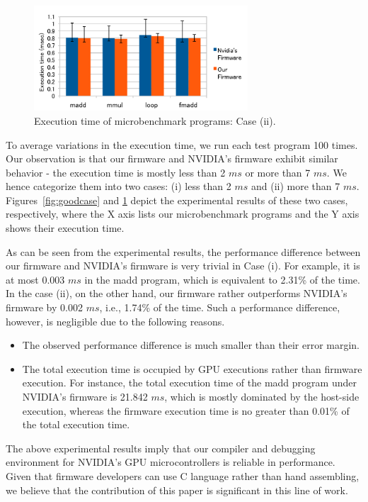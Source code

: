 \begin{figure}
 \begin{center}
  \includegraphics[width=8cm]{./img/bad_case.pdf}
 \end{center}
 \caption{Execution time of microbenchmark programs: Case (ii).}
 \label{fig:badcase}
\end{figure}

To average variations in the execution time, we run each test program 100
times.
Our observation is that our firmware and NVIDIA's firmware exhibit
similar behavior - the execution time is mostly less than 2 $ms$ or more
than 7 $ms$. 
We hence categorize them into two cases: (i) less than 2 $ms$ and (ii)
more than 7 $ms$.
Figures~\ref{fig:goodcase} and \ref{fig:badcase} depict the experimental
results of these two cases, respectively, where the X axis lists our
microbenchmark programs and the Y axis shows their execution time.

As can be seen from the experimental results, the performance difference
between our firmware and NVIDIA's firmware is very trivial in Case (i).
For example, it is at most 0.003 $ms$ in the madd program, which is
equivalent to 2.31\% of the time.
In the case (ii), on the other hand, our firmware rather outperforms
NVIDIA's firmware by 0.002 $ms$, i.e., 1.74\% of the time.
Such a performance difference, however, is negligible due to the
following reasons.
\begin{itemize}
 \item The observed performance difference is much smaller than their
       error margin.
 \item The total execution time is occupied by GPU executions rather
       than firmware execution.
       For instance, the total execution time of the madd program under
       NVIDIA's firmware is 21.842 $ms$, which is mostly dominated by the
       host-side execution, whereas the firmware execution time is no
       greater than 0.01\% of the total execution time. 
\end{itemize}

The above experimental results imply that our compiler and debugging
environment for NVIDIA's GPU microcontrollers is reliable in
performance.
Given that firmware developers can use C language rather than hand
assembling, we believe that the contribution of this paper is
significant in this line of work.

